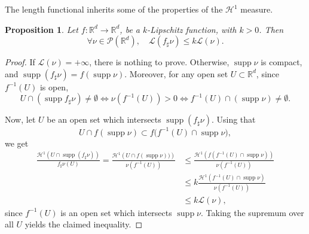 \documentclass[11pt]{article}
\numberwithin{equation}{section}
\newtheorem{proposition}[theorem]{Proposition}
\theoremstyle{definition}
\newcommand\cH{\mathcal{H}}
\newcommand\cL{\mathcal{L}}
\newcommand{\RR}{\mathbb{R}}
\DeclareMathOperator{\supp}{supp}
\begin{document}
The length functional inherits some of the properties of the $\cH^1$ measure.
\begin{proposition}\label{prop.length.lipschitz}
Let $f\colon \RR^d\rightarrow \RR^d$, be a $k$-Lipschitz function, with $k>0$. Then
\begin{equation}
\forall \nu \in \mathcal{P}(\RR^d),\quad \cL(f_\sharp\nu)\leq k \cL(\nu). \label{eq.lipschitzlength}
\end{equation}
\end{proposition}

\begin{proof}
If $\cL(\nu)=+\infty$, there is nothing to prove. Otherwise, $\supp \nu$ is compact, and $\supp(f_\sharp \nu)= f(\supp \nu)$.
Moreover, for any open set $U \subset \RR^d$, since $f^{-1}(U)$ is open,
\begin{equation*}
U\cap \left(\supp f_\sharp \nu\right)\neq \emptyset \iff \nu(f^{-1}(U))>0 \iff f^{-1}(U)\cap \left(\supp \nu\right)\neq \emptyset.
\end{equation*}

Now, let $U$ be an open set which intersects $\supp(f_\sharp \nu)$. Using that
\begin{equation*}
U\cap f(\supp \nu) \subset f\bigl(f^{-1}(U)\cap \supp \nu\bigr),
\end{equation*}
we get
\begin{align*}
\frac{\cH^1\left(U\cap \supp (f_\sharp \nu)\right)}{f_\sharp\nu(U)}= \frac{\cH^1\left(U\cap f(\supp \nu))\right)}{\nu(f^{-1}(U))}
&\leq \frac{\cH^1\left(f\left(f^{-1}(U)\cap \supp \nu\right)\right)}{\nu(f^{-1}(U))}\\
&\leq k\frac{\cH^1\left(f^{-1}(U)\cap \supp \nu\right)}{\nu(f^{-1}(U))}\\
&\leq k\mathcal{L}(\nu),
\end{align*}
since $f^{-1}(U)$ is an open set which intersects $\supp \nu$.
Taking the supremum over all $U$ yields the claimed inequality.
\end{proof}
\end{document}
